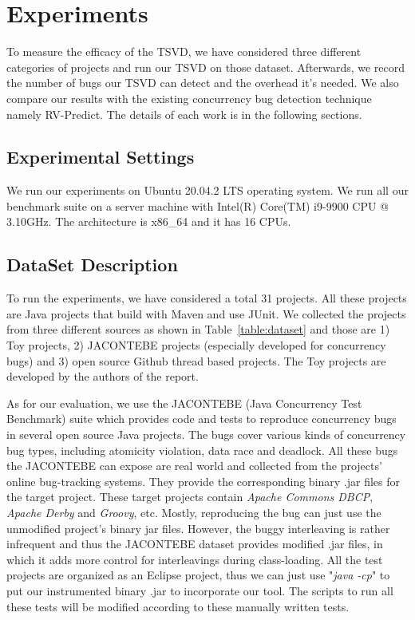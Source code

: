 \section{Experiments}
\label{sec:experiment}
To measure the efficacy of the TSVD, we have considered three different categories of projects and run our TSVD on those dataset. Afterwards, we record the number of bugs our TSVD can detect and the overhead it's needed. We also compare our results with the existing concurrency bug detection technique namely RV-Predict. The details of each work is in the following sections.

\subsection{Experimental Settings}
We run our experiments on Ubuntu 20.04.2 LTS operating system. We run all our benchmark suite on a server machine with Intel(R) Core(TM)
i9-9900 CPU @ 3.10GHz. The architecture is x86\_64 and it has 16 CPUs.

\subsection{DataSet Description}
To run the experiments, we have considered a total 31 projects. All these projects are Java projects that build with
Maven \cite{maven} and use JUnit.
We collected the projects from three different sources as shown in Table~\ref{table:dataset} and those are 1) Toy
projects, 2) JACONTEBE projects (especially developed for concurrency bugs) and
3) open source Github thread based projects. The Toy projects are
developed by the authors of the report.

As for our evaluation, we use the JACONTEBE (Java Concurrency Test Benchmark) suite
which provides code and tests to reproduce concurrency bugs in several open
source Java projects. The bugs cover various kinds of concurrency bug types,
including atomicity violation, data race and deadlock. All these bugs the JACONTEBE can expose are real world and collected from the
projects' online bug-tracking systems. They provide the corresponding binary
.jar files for the target project. These target projects contain \textit{Apache
Commons DBCP}, \textit{Apache Derby} and \textit{Groovy}, etc. Mostly,
reproducing the bug can just use the unmodified project's binary jar files.
However, the buggy interleaving is rather infrequent and thus the JACONTEBE
dataset provides modified .jar files, in which it adds more control for
interleavings during class-loading. All the test projects are organized as an
Eclipse project, thus we can just use "\textit{java -cp}" to put our
instrumented binary .jar to incorporate our tool. The scripts to run all these
tests will be modified according to these manually written tests.


